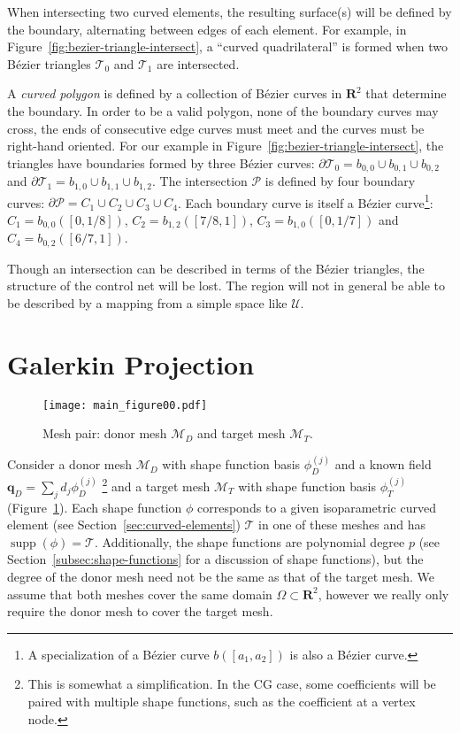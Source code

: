 \documentclass[letterpaper,10pt]{article}
\theoremstyle{definition}
\newcommand{\reals}{\mathbf{R}}
\newcommand{\utri}{\mathcal{U}}
\begin{document}
When intersecting two curved elements, the resulting surface(s) will
be defined by the boundary, alternating between edges of each
element.
For example, in Figure~\ref{fig:bezier-triangle-intersect}, a
``curved quadrilateral'' is formed when two B\'{e}zier triangles
\(\mathcal{T}_0\) and \(\mathcal{T}_1\) are intersected.

A \emph{curved polygon} is defined by a collection of B\'{e}zier curves
in \(\reals^2\) that determine the boundary. In order to be
a valid polygon, none of the boundary curves may cross, the
ends of consecutive edge curves must meet and the curves must be right-hand
oriented. For our example in
Figure~\ref{fig:bezier-triangle-intersect}, the triangles
have boundaries formed by three B\'{e}zier curves:
\(\partial \mathcal{T}_0 = b_{0, 0} \cup b_{0, 1} \cup b_{0, 2}\) and
\(\partial \mathcal{T}_1 = b_{1, 0} \cup b_{1, 1} \cup b_{1, 2}\).
The intersection \(\mathcal{P}\) is defined by four boundary
curves: \(\partial \mathcal{P} =
C_1 \cup C_2 \cup C_3 \cup C_4\). Each boundary
curve is itself a B\'{e}zier curve\footnote{A specialization of a
B\'{e}zier curve \(b\left(\left[a_1, a_2\right]\right)\)
is also a B\'{e}zier curve.}:
\(C_1 = b_{0, 0}\left(\left[0, 1/8\right]\right)\),
\(C_2 = b_{1, 2}\left(\left[7/8, 1\right]\right)\),
\(C_3 = b_{1, 0}\left(\left[0, 1/7\right]\right)\) and
\(C_4 = b_{0, 2}\left(\left[6/7, 1\right]\right)\).

Though an intersection can be described in terms of the B\'{e}zier triangles,
the structure of the control net will be lost. The region will not in general
be able to be described by a mapping from a simple space like
\(\utri\).

\section{Galerkin Projection}\label{sec:galerkin-projection}

\begin{figure}
  \texttt{[image: main\_figure00.pdf]}
  \centering
  \captionsetup{width=.75\linewidth}
  \caption{Mesh pair: donor mesh \(\mathcal{M}_D\) and
    target mesh \(\mathcal{M}_T\).}
  \label{fig:donor-target-pair}
\end{figure}

Consider a donor mesh \(\mathcal{M}_D\) with shape function basis
\(\phi_D^{(j)}\) and a known field \(\bm{q}_D = \sum_j d_j \phi_D^{(j)}\)
\footnote{This is somewhat a simplification. In the CG case,
some coefficients will be paired with multiple shape functions, such
as the coefficient at a vertex node.}
and a
target mesh \(\mathcal{M}_T\) with shape function basis \(\phi_T^{(j)}\)
(Figure~\ref{fig:donor-target-pair}).
Each shape function \(\phi\) corresponds to a
given isoparametric curved element (see Section~\ref{sec:curved-elements})
\(\mathcal{T}\) in one of these meshes and has
\(\operatorname{supp}(\phi) = \mathcal{T}\).
Additionally, the shape functions are polynomial degree \(p\) (see
Section~\ref{subsec:shape-functions} for a discussion of shape functions),
but the degree of the donor mesh need not be the same as that of the
target mesh. We assume that both meshes cover the same domain \(\Omega \subset
\reals^2\), however we really only require the donor mesh to cover the
target mesh.
\end{document}
